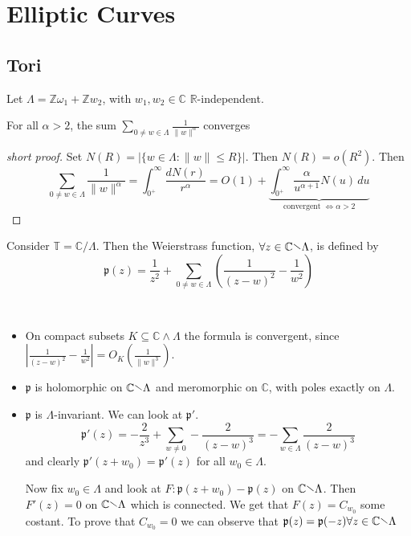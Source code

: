 \chapter{Elliptic Curves}

\section{Tori}

Let \(\Lambda = \mathbb{Z} \omega_{1} + \mathbb{Z} w_{2}\), with \(w_{1}, w_{2}
\in \mathbb{C}\) \(\mathbb{R}\)-independent.

\begin{proposition}{}
    For all \(\alpha > 2\), the sum \(\sum_{0 \neq w \in \Lambda}
    \frac{1}{\|w\|^\alpha} \) converges
\end{proposition}
\begin{proof}[short proof]
    Set \(N{(R)} = |\{w \in \Lambda : \|w\| \le R\}|\). Then \(N{(R)} =
    o{(R^2)}\). Then
    \[
      \sum_{0 \neq w \in \Lambda} \frac{1}{\|w\|^{\alpha}} =
      \int_{0^{+}}^{\infty} \frac{dN{(r)}}{r^{\alpha}} = O{(1)} +
      \underbrace{\int_{0^{+}}^{\infty} \frac{\alpha}{u^{\alpha+1}}N{(u)}
      \,du}_\text{convergent \(\iff \alpha > 2\)} 
    \]
\end{proof}

Consider \(\mathbb{T} = \mathbb{C}/\Lambda\). Then the Weierstrass function,
\(\forall z \in  \mathbb{C} \sminus \Lambda\), is defined by
\[
  \mathfrak{p}{(z)} = \frac{1}{z^2} + \sum_{0 \neq w \in \Lambda} {\left(
  \frac{1}{{(z-w)}^2} - \frac{1}{w^2} \right)} 
\]

\begin{proposition} \( \) 
\begin{itemize}
    \item On compact subsets \(K \subseteq \mathbb{C} \wedge \Lambda \) the formula
is convergent, since \(\left| \frac{1}{{(z-w)}^2} - \frac{1}{w^2} \right| = O_K
{(\frac{1}{\|w\|^3})}\).
    \item \(\mathfrak{p}\) is holomorphic on \(\mathbb{C}
\sminus \Lambda\) and meromorphic on \(\mathbb{C}\), with poles exactly on
\(\Lambda\).
    \item \(\mathfrak{p}\) is \(\Lambda\)-invariant. We can look at
        \(\mathfrak{p}'\).
        \[
          \mathfrak{p}'{(z)} = -\frac{2}{z^3} + \sum_{w \neq 0}
          -\frac{2}{{(z-w)}^3} = - \sum_{w \in \Lambda} \frac{2}{{(z-w)}^3}
        \]
        and clearly \(\mathfrak{p}'{(z + w_{0})} = \mathfrak{p}'{(z)}\) for all
        \(w_{0} \in \Lambda\).
        
        Now fix \(w_{0} \in \Lambda\) and look at \(F : \mathfrak{p}{(z + w_{0})}
        - \mathfrak{p}{(z)}\) on \(\mathbb{C} \sminus\Lambda\). Then \(F'{(z)} =
        0\) on \(\mathbb{C} \sminus\Lambda\) which is connected. We get that
        \(F{(z)} = C_{w_{0}} \) some costant. To prove that \(C_{w_{0}} = 0\) we
        can observe that \(\mathfrak{p}{(z)} = \mathfrak{p}{(-z)} \forall z \in
        \mathbb{C} \sminus\Lambda\) 

\end{itemize}
\end{proposition}

